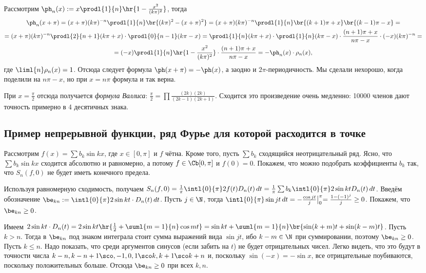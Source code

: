 \documentclass[a4paper]{article}
\newcommand{\intlop}{\intl{0}{\pi}}
\newcommand{\frpi}{\frac{1}{\pi}}
\newcommand{\sbs}[2]{\bigl|_{{#1}}^{{#2}}}
\begin{document}
\begin{ex}
Рассмотрим $\ph_n(x) := x\prodl{1}{n} \hr{1 - \frac{x^2}{(k\pi)^2}}$, тогда
\begin{multline*}
\ph_n(x+\pi)=(x+\pi)(k\pi)^{-n}\prodl{1}{n}\br{(k\pi)^2-(x+\pi)^2}=
(x+\pi)(k\pi)^{-n}\prodl{1}{n}\br{(k+1)\pi+x}\br{(k-1)\pi-x} =\\
=(x+\pi)(k\pi)^{-n}\prodl{2}{n+1}(k\pi+x)\cdot \prodl{0}{n-1}(k\pi-x)=
\prodl{1}{n}(k\pi+x)\cdot\prodl{1}{n}(k\pi-x) \cdot\frac{(n+1)\pi + x}{n\pi -x}\cdot(-x)(k\pi)^{-n} =\\
=(-x)\prodl{1}{n}\hr{1-\frac{x^2}{(k\pi)^2}} \cdot \frac{(n+1)\pi + x}{n\pi -x} =
-\ph_n(x)\cdot\rho_n(x),
\end{multline*}
 где $\liml{n}\rho_n(x)=1$. Отсюда следует формула $\ph(x+\pi) = -\ph(x)$, а заодно
и $2\pi$-периодичность. Мы сделали нехорошо, когда поделили на $n\pi -x$, но при $x=n\pi$ формула и так верна.

При $x = \frac{\pi}{2}$ отсюда получается \emph{формула Валлиса}: $\frac{\pi}{2} = \prod \frac{(2k)(2k)}{(2k-1)(2k+1)}$. Сходится это произведение очень медленно:
10000 членов дают точность примерно в 4 десятичных знака.
\end{ex}

\subsection{Пример непрерывной функции, ряд Фурье для которой расходится в точке}

Рассмотрим $f(x) = \sum b_k \sin kx$, где $x\in [0,\pi]$ и $f$ чётна. Кроме того, пусть $\sum b_k$ сходящийся неотрицательный ряд. Ясно,
что $\sum b_k \sin kx$ сходится абсолютно и равномерно, а потому $f \in\Cb[0,\pi]$ и $f(0)=0$. Покажем, что можно подобрать коэффициенты $b_k$
так, что $S_n(f,0)$ не будет иметь конечного предела.

Используя равномерную сходимость, получаем $S_n(f,0) = \frpi \intlop 2f(t)D_n(t)\,d t = \frpi \sum
b_k\intlop 2\sin kt D_n(t) \,d t$. Введём обозначение $\be_{kn} := \intlop 2\sin kt \cdot
D_n(t)\,d t$. Пусть $j \in \N$, тогда $\intlop \sin jt \,d t = -\frac{\cos jt}{j}\sbs{0}{\pi} =
\frac{1 - (-1)^j}{j} \ge 0$. Покажем, что $\be_{kn} \ge 0$.

Имеем $2\sin kt \cdot D_n(t) = 2\sin kt\hr{\frac{1}{2}+\suml{m=1}{n}\cos mt} = \sin kt + \suml{m=1}{n}\br{\sin(k+m)t + \sin(k-m)t}$.
Пусть $k>n$. Тогда в $\be_{kn}$ под знаком интеграла стоит сумма выражений вида $\sin jt$, ибо $k - m \in \N$ при суммировании, поэтому $\be_{kn} \ge 0$.
Пусть $k \le n$. Надо показать, что среди аргументов синусов (если забить на $t$) не будет отрицательных чисел. Легко видеть, что это будут в точности
числа $k-n,k-n+1\sco,-1,0,1\sco k,k+1\sco k+n$ и, поскольку $\sin(-x) = -\sin x$, все отрицательные поубиваются, поскольку положительных больше.
Отсюда $\be_{kn} \ge 0$ при всех $k,n$.
\end{document}

